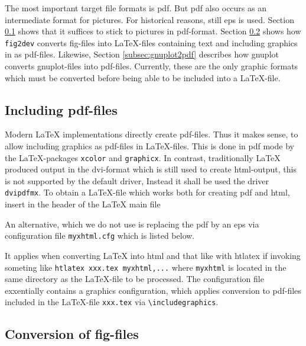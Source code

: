 \documentclass[12pt]{article}
\begin{document}
The most important target file formats is \gls{pdf}. 
But pdf also occurs as an intermediate format for pictures. 
For historical reasons, still \gls{eps} is used. 
Section \ref{subsec:figpdf} shows that it suffices to stick to pictures 
in pdf-format. 
Section \ref{subsec:fig2dev} shows how {\tt fig2dev} converts fig-files 
into \LaTeX-files containing text and including graphics in as pdf-files. 
Likewise, Section \ref{subsec:gnuplot2pdf} describes 
how gnuplot converts gnuplot-files into pdf-files. 
Currently, these are the only graphic formats which must be converted 
before being able to be included into a \LaTeX-file. 



\subsection{Including pdf-files}\label{subsec:figpdf}

Modern \LaTeX{} implementations directly create pdf-files. 
Thus it makes sense, to allow including graphics as pdf-files 
in \LaTeX-files. 
This is done in pdf mode 
by the \LaTeX-packages {\tt xcolor} and {\tt graphicx}. 
In contrast, traditionally \LaTeX{} produced output in the \gls{dvi}-format 
which is still used to create \gls{html}-output, 
this is not supported by the default driver, 
Instead it shall be used the driver {\tt dvipdfmx}. 
To obtain a \LaTeX-file which works both for creating pdf and html, 
insert in the header of the \LaTeX{} main file 
%
\lstset{language=tex, basicstyle=\small}


An alternative, which we do not use 
is replacing the pdf by an \gls{eps} via configuration file {\tt myxhtml.cfg} 
which is listed below. 
%
\lstset{language=tex, basicstyle=\scriptsize}

%
It applies when converting \LaTeX{} into html and that like 
with htlatex if invoking someting like {\tt htlatex xxx.tex myxhtml,...} 
where {\tt myxhtml} is located in the same directory as the \LaTeX-file 
to be processed. 
The configuration file exxentially contains a graphics configuration, 
which applies conversion to pdf-files included in the \LaTeX-file {\tt xxx.tex}
via {\tt \textbackslash includegraphics}. 


\subsection{Conversion of fig-files}\label{subsec:fig2dev}
\end{document}
